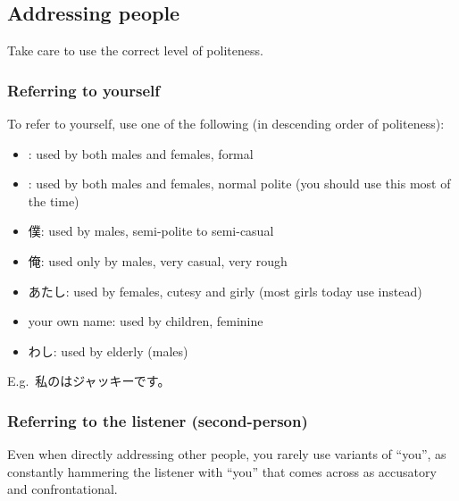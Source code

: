 \documentclass[../nihongo-gakushuu-kyouzai.tex]{subfiles}
\begin{document}
\subsection{Addressing people}
Take care to use the correct level of politeness.

\subsubsection{Referring to yourself}
To refer to yourself, use one of the following (in descending order of politeness):
\begin{itemize}
    \item {}: used by both males and females, formal
    \item {}: used by both males and females, normal polite (you should use this most of the time)
    \item 僕: used by males, semi-polite to semi-casual
    \item 俺: used only by males, very casual, very rough
    \item あたし: used by females, cutesy and girly (most girls today use  instead)
    \item your own name: used by children, feminine
    \item わし: used by elderly (males)
\end{itemize}

E.g.\ 私のはジャッキーです。

\subsubsection{Referring to the listener (second-person)}
Even when directly addressing other people, you rarely use variants of ``you'', as constantly hammering the listener with ``you'' that comes across as accusatory and confrontational.
\end{document}
